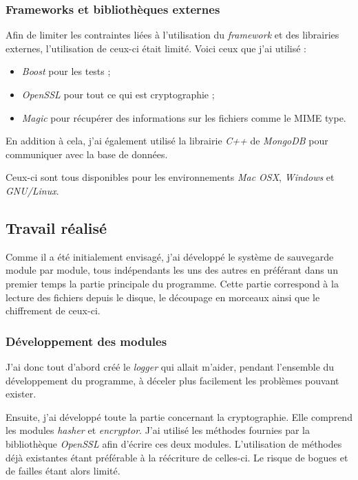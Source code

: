 \documentclass[a4paper,10pt, twoside]{report}
\begin{document}
\begin{spacing}{1.2}
\subsubsection{Frameworks et bibliothèques externes}

Afin de limiter les contraintes liées à l'utilisation du \textit{framework} et
des librairies externes, l'utilisation de ceux-ci était limité. Voici ceux que
j'ai utilisé :
\begin{itemize}
 \item \textit{Boost} pour les tests ;
 \item \textit{OpenSSL} pour tout ce qui est cryptographie ;
 \item \textit{Magic} pour récupérer des informations sur les fichiers comme le
 MIME type.
\end{itemize}

En addition à cela, j'ai également utilisé la librairie \textit{C++} de
\textit{MongoDB} pour communiquer avec la base de données.

Ceux-ci sont tous disponibles pour les environnements \textit{Mac OSX},
\textit{Windows} et \textit{GNU/Linux}.

\subsection{Travail réalisé}

Comme il a été initialement envisagé, j'ai développé le système de sauvegarde
module par module, tous indépendants les uns des autres en préférant dans un
premier temps la partie principale du programme. Cette partie correspond à la
lecture des fichiers depuis le disque, le découpage en morceaux ainsi que le
chiffrement de ceux-ci.

\subsubsection{Développement des modules}

J'ai donc tout d'abord créé le \textit{logger} qui allait m'aider, pendant
l'ensemble du développement du programme, à déceler plus facilement les
problèmes pouvant exister.

Ensuite, j'ai développé toute la partie concernant la cryptographie. Elle
comprend les modules \textit{hasher} et \textit{encryptor}. J'ai utilisé les
méthodes fournies par la bibliothèque \textit{OpenSSL} afin d'écrire ces deux
modules. L'utilisation de méthodes déjà existantes étant préférable à la
réécriture de celles-ci. Le risque de bogues et de failles étant alors limité.


\end{spacing}
\end{document}

